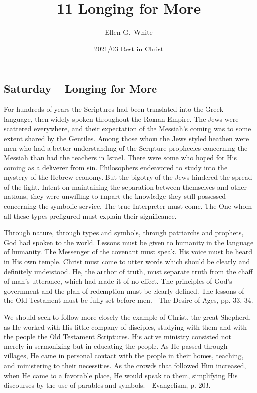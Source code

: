 \documentclass[a4paper, 10pt, twoside, headings=small]{scrartcl}
\title{11 Longing  for More}
\author{Ellen G.\ White}
\date{2021/03 Rest in Christ}
\begin{document}
\maketitle

\thispagestyle{empty}

\pagestyle{fancy}

\begin{multicols}{2}

\section*{Saturday – Longing  for More}

For hundreds of years the Scriptures had been translated into the Greek language, then widely spoken throughout the Roman Empire. The Jews were scattered everywhere, and their expectation of the Messiah’s coming was to some extent shared by the Gentiles. Among those whom the Jews styled heathen were men who had a better understanding of the Scripture prophecies concerning the Messiah than had the teachers in Israel. There were some who hoped for His coming as a deliverer from sin. Philosophers endeavored to study into the mystery of the Hebrew economy. But the bigotry of the Jews hindered the spread of the light. Intent on maintaining the separation between themselves and other nations, they were unwilling to impart the knowledge they still possessed concerning the symbolic service. The true Interpreter must come. The One whom all these types prefigured must explain their significance.

Through nature, through types and symbols, through patriarchs and prophets, God had spoken to the world. Lessons must be given to humanity in the language of humanity. The Messenger of the covenant must speak. His voice must be heard in His own temple. Christ must come to utter words which should be clearly and definitely understood. He, the author of truth, must separate truth from the chaff of man’s utterance, which had made it of no effect. The principles of God’s government and the plan of redemption must be clearly defined. The lessons of the Old Testament must be fully set before men.—The Desire of Ages, pp. 33, 34.

We should seek to follow more closely the example of Christ, the great Shepherd, as He worked with His little company of disciples, studying with them and with the people the Old Testament Scriptures. His active ministry consisted not merely in sermonizing but in educating the people. As He passed through villages, He came in personal contact with the people in their homes, teaching, and ministering to their necessities. As the crowds that followed Him increased, when He came to a favorable place, He would speak to them, simplifying His discourses by the use of parables and symbols.—Evangelism, p. 203.


\end{multicols}
\end{document}

